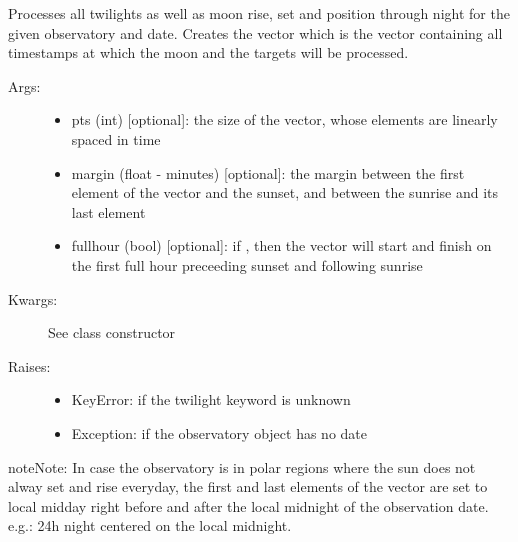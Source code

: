 \documentclass[letterpaper,10pt,english]{sphinxmanual}
\begin{document}
\begin{fulllineitems}
\begin{fulllineitems}
\end{fulllineitems}


\begin{fulllineitems}
\label{astroobs:astroobs.Observatory.process_obs}
Processes all twilights as well as moon rise, set and position through night for the given observatory and date.
Creates the vector  which is the vector containing all timestamps at which the moon and the targets will be processed.
\begin{description}
\item[{Args:}] \leavevmode\begin{itemize}
\item {} 
pts (int) {[}optional{]}: the size of the  vector, whose elements are linearly spaced in time

\item {} 
margin (float - minutes) {[}optional{]}: the margin between the first element of the vector  and the sunset, and between the sunrise and its last element

\item {} 
fullhour (bool) {[}optional{]}: if , then the vector  will start and finish on the first full hour preceeding sunset and following sunrise

\end{itemize}

\item[{Kwargs:}] \leavevmode
See class constructor

\item[{Raises:}] \leavevmode\begin{itemize}
\item {} 
KeyError: if the twilight keyword is unknown

\item {} 
Exception: if the observatory object has no date

\end{itemize}

\end{description}

\begin{notice}{note}{Note:}
In case the observatory is in polar regions where the sun does not alway set and rise everyday, the first and last elements of the  vector are set to local midday right before and after the local midnight of the observation date. e.g.: 24h night centered on the local midnight.
\end{notice}


\end{fulllineitems}
\end{fulllineitems}
\end{document}
